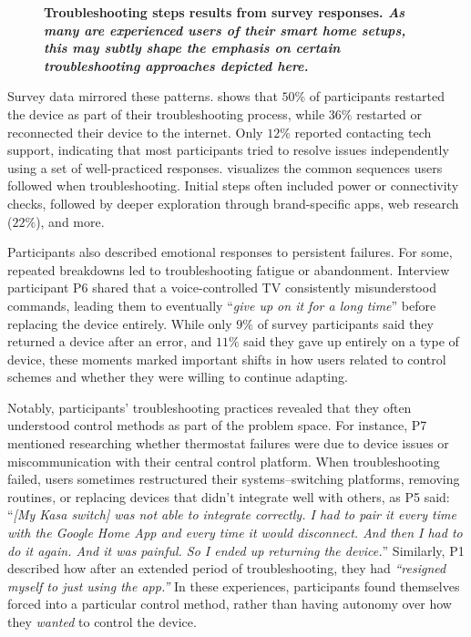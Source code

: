 \begin{figure}[th!]
\begin{subfigure}{\linewidth}
{        }
        \label{cic:fig:survey-troubleshooting-sequence}
    \end{subfigure}
    \caption{\bf \small Troubleshooting steps results from survey responses. {\it As many are experienced users of their smart home setups, this may subtly shape the emphasis on certain troubleshooting approaches depicted here.}
    }
    \label{cic:fig:survey-troubleshooting}
    \medskip
\end{figure}

Survey data mirrored these patterns.  shows that $50\%$ of participants restarted the device as part of their troubleshooting process, while $36\%$ restarted or reconnected their device to the internet. Only $12\%$ reported contacting tech support, indicating that most participants tried to resolve issues independently using a set of well-practiced responses.  visualizes the common sequences users followed when troubleshooting. Initial steps often included power or connectivity checks, followed by deeper exploration through brand-specific apps, web research ($22\%$), and more.

Participants also described emotional responses to persistent failures. For some, repeated breakdowns led to troubleshooting fatigue or abandonment. Interview participant P6 shared that a voice-controlled TV consistently misunderstood commands, leading them to eventually ``\textit{give up on it for a long time}'' before replacing the device entirely. While only $9\%$ of survey participants said they returned a device after an error, and $11\%$ said they gave up entirely on a type of device, these moments marked important shifts in how users related to control schemes and whether they were willing to continue adapting.

Notably, participants' troubleshooting practices revealed that they often understood control methods as part of the problem space. For instance, P7 mentioned researching whether thermostat failures were due to device issues or miscommunication with their central control platform. When troubleshooting failed, users sometimes restructured their systems--switching platforms, removing routines, or replacing devices that didn't integrate well with others, as P5 said: ``\textit{[My Kasa switch] was not able to integrate correctly. I had to pair it every time with the Google Home App and every time it would disconnect. And then I had to do it again. And it was painful. So I ended up returning the device.}'' Similarly, P1 described how after an extended period of troubleshooting, they had \textit{``resigned myself to just using the app.''} In these experiences, participants found themselves forced into a particular control method, rather than having autonomy over how they \textit{wanted} to control the device.

